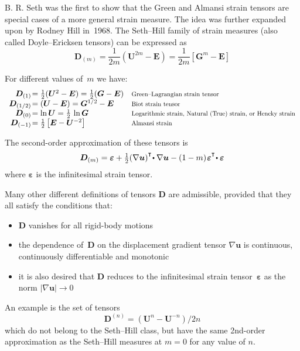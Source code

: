 \begin{otherlanguage}{russian}
{B. R. Seth was the first to show that the Green and Almansi strain tensors are special cases of a more general strain measure. The idea was further expanded upon by Rodney Hill in~1968. The Seth\hbox{--}Hill family of strain measures (also called Doyle\hbox{--}Ericksen tensors) can be expressed as
\[ \displaystyle \bm{D}_{(m)} = \frac{1}{2m} (\bm{U}^{2m} \! - \bm{E}) = \frac{1}{2m} \left[\bm{G}^{m} \! - \bm{E} \right] \]

For different values of~$m$ we have:
\[ \textstyle \begin{array}{r@{\hspace{0.1em}}ll}
\bm{D}_{(1)} & = \onehalf (\bm{U}^{2} - \bm{E}) = \onehalf (\bm{G} - \bm{E}) & \text{\scalebox{0.8}{Green\hbox{--}Lagrangian strain tensor}} \\
\bm{D}_{(1/2)} & = (\bm{U} - \bm{E}) = \bm{G}^{1/2} - \bm{E} & \text{\scalebox{0.8}{Biot strain tensor}} \\
\bm{D}_{(0)} & = \ln \bm{U} = \onehalf\, \ln \bm{G} & \text{\scalebox{0.8}{Logarithmic strain, Natural~(True) strain, or Hencky strain}} \\
\bm{D}_{(-1)} & = \onehalf \left[ \bm{E} - \bm{U}^{-2} \right] & \text{\scalebox{0.8}{Almansi strain}}
\end{array} \]

The second\hbox{-}order approximation of these tensors is
\[ \displaystyle \bm{D}_{(m)} = \bm{\varepsilon} + \tfrac{1}{2} (\nabla \bm{u} )^{\T}\! \dotp \nabla \bm{u} - (1 - m) \hspace{0.2ex} {\bm{\varepsilon}}^{\T}\! \dotp \bm{\varepsilon} \]
where $\bm{\varepsilon}$ is the infinitesimal strain tensor.

Many other different definitions of tensors $\bm{D}$ are admissible, provided that they all satisfy the conditions that:

\begin{itemize}
\item $\bm{D}$ vanishes for all rigid\hbox{-}body motions
\item the dependence of~$\bm{D}$ on the displacement gradient tensor ${\nabla \bm{u}}$ is continuous, continuously differentiable and monotonic
\item it is also desired that $\bm{D}$ reduces to the infinitesimal strain tensor~$\bm{\varepsilon}$ as the norm ${| \nabla\bm{u}| \to 0}$
\end{itemize}

An example is the set of tensors
\[ \displaystyle \bm{D}^{(n)} = \left( {\bm{U}}^{n} - {\bm{U}}^{-n} \right) / 2n \]
which do not belong to the Seth\hbox{--}Hill class, but have the same 2nd\hbox{-}order approximation as the Seth\hbox{--}Hill measures at ${m=0}$ for any value of $n$.

}
\end{otherlanguage}
